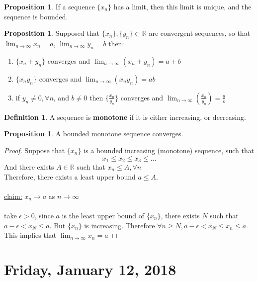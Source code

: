 \documentclass[12pt]{article}
\theoremstyle{plain}
\theoremstyle{definition}
\newtheorem{definition}[theorem]{Definition}
\newtheorem{proposition}[theorem]{Proposition}
\begin{document}
\begin{proposition}
    If a sequence $\{x_n \}$ has a limit, then this limit is unique, and the sequence is bounded.
\end{proposition}

\begin{proposition}
    Supposed that $\{x_n \} , \{y_n \} \subset \mathbb{R} $ are convergent sequences, so that $\lim_{n\to\infty} x_n = a$, $\lim_{n\to\infty} y_n = b$ then:
    \begin{enumerate}
        \item $\{x_n + y_n \}$ converges and $\lim_{n\to\infty} (x_n + y_n) = a+b$
        \item $\{x_n y_n \}$ converges and $\lim_{n\to\infty} (x_n y_n) = ab$
        \item if $y_n \neq 0, \forall n$, and $b\neq 0$ then $\{\frac{x_n}{y_n} \}$ converges and $\lim_{n\to\infty} ( \frac{x_n}{y_n}) = \frac{a}{b}$
    \end{enumerate}
\end{proposition}

\begin{definition}
    A sequence is \textbf{monotone} if it is either increasing, or decreasing.
\end{definition}

\begin{proposition}
    A bounded monotone sequence converges.
\end{proposition}

\begin{proof}
    Suppose that $\{x_n \}$ is a bounded increasing (monotone) sequence, such that
    $$x_1 \leq x_2 \leq x_3 \leq ...$$
    And there exists $A\in\mathbb{R}$ such that $x_n \leq A, \forall n$\\
    Therefore, there exists a least upper bound $a \leq A$.\\
    \\
    \underline{claim:} $x_n \to a$ as $n \to \infty$\\
    \\
    take $\epsilon > 0$, since $a$ is the least upper bound of $\{ x_n \}$, there exists $N$ such that $a-\epsilon < x_N \leq a$. But $\{ x_n \}$ is increasing. Therefore $\forall n \geq N, a-\epsilon < x_N \leq x_n \leq a$. This implies that $\lim_{n\to\infty} x_n = a$
\end{proof}

\newpage

\section{Friday, January 12, 2018}
\end{document}

